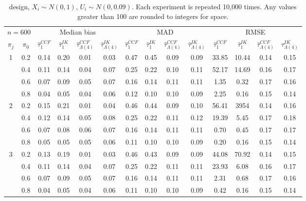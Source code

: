 \begin{table}[h!]
\begin{threeparttable}
\begin{tabular*}{\textwidth}{@{\extracolsep{\fill}} c c c c c c c c c c c c c c}
\midrule
\midrule
\multicolumn{2}{c}{$n=600$} & \multicolumn{4}{c}{Median bias} & \multicolumn{4}{c}{MAD} & \multicolumn{4}{c}{RMSE} \\
\cmidrule(r){1-2} \cmidrule(r){3-6} \cmidrule(l){7-10} \cmidrule(l){11-14}
$\pi_j$ & $\pi_0$ & $\hat{\tau}^{CCF}_{1}$ & $\hat{\tau}^{IK}_{1}$ & $\hat{\tau}^{CCF}_{\Lambda(4)}$ & $\hat{\tau}^{IK}_{\Lambda(4)}$ &
$\hat{\tau}^{CCF}_{1}$ & $\hat{\tau}^{IK}_{1}$ & $\hat{\tau}^{CCF}_{\Lambda(4)}$ & $\hat{\tau}^{IK}_{\Lambda(4)}$ &
$\hat{\tau}^{CCF}_{1}$ & $\hat{\tau}^{IK}_{1}$ & $\hat{\tau}^{CCF}_{\Lambda(4)}$ & $\hat{\tau}^{IK}_{\Lambda(4)}$ \\
\midrule
\multirow{4}{*}{1} & 0.2 & 0.14 & 0.20 & 0.01 & 0.03 & 0.47 & 0.45 & 0.09 & 0.09 & 33.85 & 10.44 & 0.14 & 0.15 \\
& 0.4 & 0.11 & 0.14 & 0.04 & 0.07 & 0.25 & 0.22 & 0.10 & 0.11 & 52.17 & 14.69 & 0.16 & 0.17 \\
& 0.6 & 0.07 & 0.09 & 0.05 & 0.07 & 0.16 & 0.14 & 0.11 & 0.11 & 1.35 & 0.32 & 0.17 & 0.16 \\
& 0.8 & 0.04 & 0.05 & 0.04 & 0.06 & 0.12 & 0.10 & 0.10 & 0.09 & 2.25 & 0.16 & 0.15 & 0.14 \\
\hline
\multirow{4}{*}{2} & 0.2 & 0.15 & 0.21 & 0.01 & 0.04 & 0.46 & 0.44 & 0.09 & 0.10 & 56.41 & 3954 & 0.14 & 0.16 \\
& 0.4 & 0.12 & 0.14 & 0.05 & 0.08 & 0.25 & 0.22 & 0.11 & 0.12 & 19.39 & 5.45 & 0.17 & 0.18 \\
& 0.6 & 0.07 & 0.08 & 0.06 & 0.07 & 0.16 & 0.14 & 0.11 & 0.11 & 0.70 & 0.45 & 0.17 & 0.17 \\
& 0.8 & 0.05 & 0.05 & 0.05 & 0.06 & 0.11 & 0.10 & 0.10 & 0.09 & 0.20 & 0.16 & 0.15 & 0.14 \\
\hline
\multirow{4}{*}{3} & 0.2 & 0.13 & 0.19 & 0.01 & 0.03 & 0.46 & 0.43 & 0.09 & 0.09 & 44.08 & 70.92 & 0.14 & 0.15 \\
& 0.4 & 0.11 & 0.14 & 0.04 & 0.07 & 0.25 & 0.22 & 0.11 & 0.11 & 23.93 & 6.08 & 0.16 & 0.17 \\
& 0.6 & 0.07 & 0.09 & 0.05 & 0.07 & 0.16 & 0.14 & 0.11 & 0.11 & 2.31 & 0.68 & 0.17 & 0.16 \\
& 0.8 & 0.04 & 0.05 & 0.04 & 0.06 & 0.11 & 0.10 & 0.10 & 0.09 & 0.42 & 0.16 & 0.15 & 0.14 \\
\bottomrule
\end{tabular*}
\caption*{\citet{lee2008randomized} design, $X_i \sim N(0,1)$, $U_i \sim N(0,0.09)$. Each experiment is repeated 10,000 times. Any values greater than 100 are rounded to integers for space.}
\label{table estimation lee normal concise}
\end{threeparttable}
\end{table}
